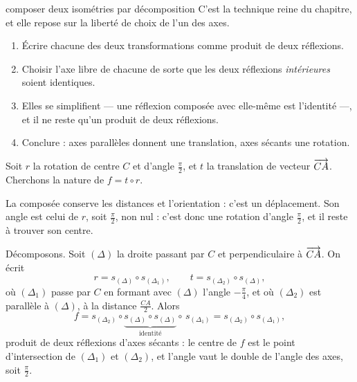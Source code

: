 \begin{methode}{composer deux isométries par décomposition}
C'est la technique reine du chapitre, et elle repose sur la liberté de choix
de l'un des axes.
\begin{enumerate}[label=\textbf{\arabic*.}, leftmargin=*, itemsep=0.15em]
  \item Écrire chacune des deux transformations comme produit de deux
        réflexions.
  \item Choisir l'axe libre de chacune de sorte que les deux réflexions
        \emph{intérieures} soient identiques.
  \item Elles se simplifient — une réflexion composée avec elle-même est
        l'identité —, et il ne reste qu'un produit de deux réflexions.
  \item Conclure : axes parallèles donnent une translation, axes sécants une
        rotation.
\end{enumerate}
\end{methode}

\begin{exemple}
Soit $r$ la rotation de centre $C$ et d'angle $\frac{\pi}{2}$, et $t$ la
translation de vecteur $\overrightarrow{CA}$. Cherchons la nature de
$f = t \circ r$.

La composée conserve les distances et l'orientation : c'est un déplacement.
Son angle est celui de $r$, soit $\frac{\pi}{2}$, non nul : c'est donc une
rotation d'angle $\frac{\pi}{2}$, et il reste à trouver son centre.

Décomposons. Soit $(\Delta)$ la droite passant par $C$ et perpendiculaire à
$\overrightarrow{CA}$. On écrit
\[
  r = s_{(\Delta)} \circ s_{(\Delta_{1})},
  \qquad
  t = s_{(\Delta_{2})} \circ s_{(\Delta)},
\]
où $(\Delta_{1})$ passe par $C$ en formant avec $(\Delta)$ l'angle
$-\frac{\pi}{4}$, et où $(\Delta_{2})$ est parallèle à $(\Delta)$, à la
distance $\frac{CA}{2}$. Alors
\[
  f = s_{(\Delta_{2})} \circ \underbrace{s_{(\Delta)} \circ s_{(\Delta)}}_{
  \text{identité}} \circ\, s_{(\Delta_{1})}
  = s_{(\Delta_{2})} \circ s_{(\Delta_{1})},
\]
produit de deux réflexions d'axes sécants : le centre de $f$ est le point
d'intersection de $(\Delta_{1})$ et $(\Delta_{2})$, et l'angle vaut le double
de l'angle des axes, soit $\frac{\pi}{2}$.
\end{exemple}

